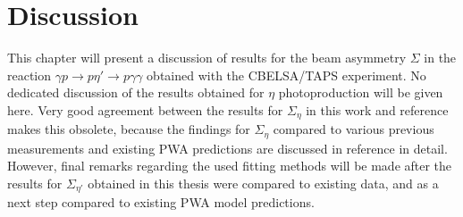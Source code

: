 \chapter{Discussion}
\label{chap:disc}
This chapter will present a discussion of results for the beam asymmetry $\Sigma$ in the reaction $\gamma p \to p\eta'\to p\gamma\gamma$ obtained with the CBELSA/TAPS experiment. No dedicated discussion of the results obtained for $\eta$ photoproduction will be given here. Very good agreement between the results for $\Sigma_\eta$ in this work and reference \cite{farahphd} makes this obsolete, because the findings for $\Sigma_\eta$ compared to various previous measurements and existing PWA predictions are discussed in reference \cite{farahphd} in detail. However, final remarks regarding the used fitting methods will be made after the results for $\Sigma_{\eta'}$ obtained in this thesis were compared to existing data, and as a next step compared to existing PWA model predictions. 
